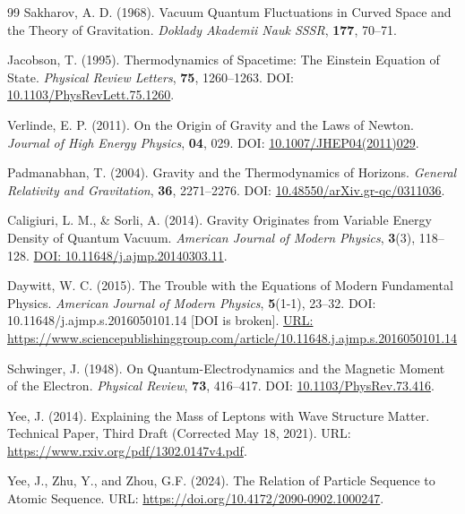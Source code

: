 \documentclass[10pt,a4paper]{article}
\begin{document}
\begin{thebibliography}{99}
	Sakharov, A. D. (1968).
	Vacuum Quantum Fluctuations in Curved Space and the Theory of Gravitation.
	\textit{Doklady Akademii Nauk SSSR}, \textbf{177}, 70–71.
	
	Jacobson, T. (1995).
	Thermodynamics of Spacetime: The Einstein Equation of State.
	\textit{Physical Review Letters}, \textbf{75}, 1260–1263.
	DOI: \href{https://doi.org/10.1103/PhysRevLett.75.1260}{10.1103/PhysRevLett.75.1260}.
	
	Verlinde, E. P. (2011).
	On the Origin of Gravity and the Laws of Newton.
	\textit{Journal of High Energy Physics}, \textbf{04}, 029.
	DOI: \href{https://doi.org/10.1007/JHEP04(2011)029}{10.1007/JHEP04(2011)029}.
	
	Padmanabhan, T. (2004).
	Gravity and the Thermodynamics of Horizons.
	\textit{General Relativity and Gravitation}, \textbf{36}, 2271–2276.
	DOI: \href{https://doi.org/10.48550/arXiv.gr-qc/0311036}{10.48550/arXiv.gr-qc/0311036}.
	
	Caligiuri, L. M., \& Sorli, A. (2014). Gravity Originates from Variable Energy Density of Quantum Vacuum. \textit{American Journal of Modern Physics}, \textbf{3}(3), 118--128.
	\href{https://doi.org/10.11648/j.ajmp.20140303.11}{DOI: 10.11648/j.ajmp.20140303.11}.
	
	Daywitt, W. C. (2015). The Trouble with the Equations of Modern Fundamental Physics. \textit{American Journal of Modern Physics}, \textbf{5}(1-1), 23--32.
	DOI: 10.11648/j.ajmp.s.2016050101.14 [DOI is broken].
	\href{https://www.sciencepublishinggroup.com/article/10.11648.j.ajmp.s.2016050101.14}{URL: https://www.sciencepublishinggroup.com/article/10.11648.j.ajmp.s.2016050101.14}
	
	Schwinger, J. (1948).
	On Quantum-Electrodynamics and the Magnetic Moment of the Electron.
	\textit{Physical Review}, \textbf{73}, 416–417.
	DOI: \href{https://doi.org/10.1103/PhysRev.73.416}{10.1103/PhysRev.73.416}.
	
	Yee, J. (2014).
	Explaining the Mass of Leptons with Wave Structure Matter.
	Technical Paper, Third Draft (Corrected May 18, 2021).
	URL: \href{https://www.rxiv.org/pdf/1302.0147v4.pdf}{https://www.rxiv.org/pdf/1302.0147v4.pdf}.
	
	Yee, J., Zhu, Y., and Zhou, G.F. (2024).
	The Relation of Particle Sequence to Atomic Sequence.
	URL: \href{https://doi.org/10.4172/2090-0902.1000247}{https://doi.org/10.4172/2090-0902.1000247}.
	

\end{thebibliography}
\end{document}
